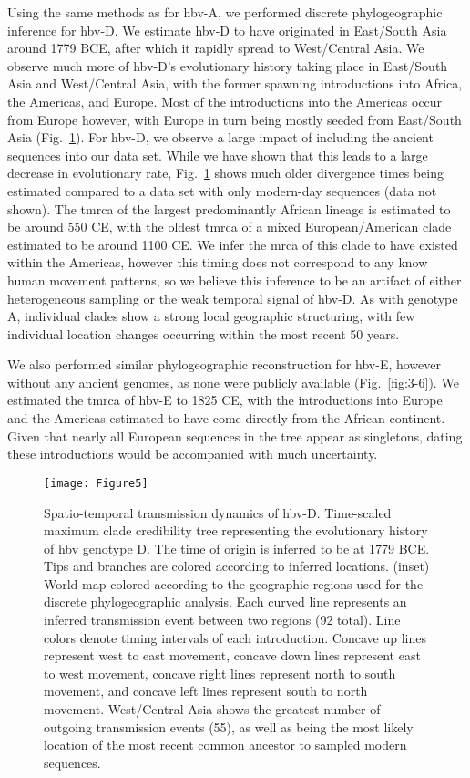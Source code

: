 Using the same methods as for \gls{hbv}-A, we performed discrete phylogeographic inference for \gls{hbv}-D.
We estimate \gls{hbv}-D to have originated in East/South Asia around 1779 BCE, after which it rapidly spread to West/Central Asia.
We observe much more of \gls{hbv}-D's evolutionary history taking place in East/South Asia and West/Central Asia, with the former spawning introductions into Africa, the Americas, and Europe.
Most of the introductions into the Americas occur from Europe however, with Europe in turn being mostly seeded from East/South Asia (Fig.~\ref{fig:3-5}).
For \gls{hbv}-D, we observe a large impact of including the ancient sequences into our data set.
While we have shown that this leads to a large decrease in evolutionary rate, Fig.~\ref{fig:3-5} shows much older divergence times being estimated compared to a data set with only modern-day sequences (data not shown).
The \gls{tmrca} of the largest predominantly African lineage is estimated to be around 550 CE, with the oldest \gls{tmrca} of a mixed European/American clade estimated to be around 1100 CE.
We infer the \gls{mrca} of this clade to have existed within the Americas, however this timing does not correspond to any know human movement patterns, so we believe this inference to be an artifact of either heterogeneous sampling or the weak temporal signal of \gls{hbv}-D.
As with genotype A, individual clades show a strong local geographic structuring, with few individual location changes occurring within the most recent 50 years.

We also performed similar phylogeographic reconstruction for \gls{hbv}-E, however without any ancient genomes, as none were publicly available (Fig.~\ref{fig:3-6}).
We estimated the \gls{tmrca} of \gls{hbv}-E to 1825 CE, with the introductions into Europe and the Americas estimated to have come directly from the African continent.
Given that nearly all European sequences in the tree appear as singletons, dating these introductions would be accompanied with much uncertainty.

\begin{figure}[ht]
  \centering
  \texttt{[image: Figure5]}
  \caption[HBV-D phylogeography]{Spatio-temporal transmission dynamics of \gls{hbv}-D. Time-scaled maximum clade credibility tree representing the evolutionary history of \gls{hbv} genotype D. The time of origin is inferred to be at 1779 BCE. Tips and branches are colored according to inferred locations. (inset) World map colored according to the geographic regions used for the discrete phylogeographic analysis. Each curved line represents an inferred transmission event between two regions (92 total). Line colors denote timing intervals of each introduction. Concave up lines represent west to east movement, concave down lines represent east to west movement, concave right lines represent north to south movement, and concave left lines represent south to north movement. West/Central Asia shows the greatest number of outgoing transmission events (55), as well as being the most likely location of the most recent common ancestor to sampled modern sequences.}
  \label{fig:3-5}
\end{figure}

